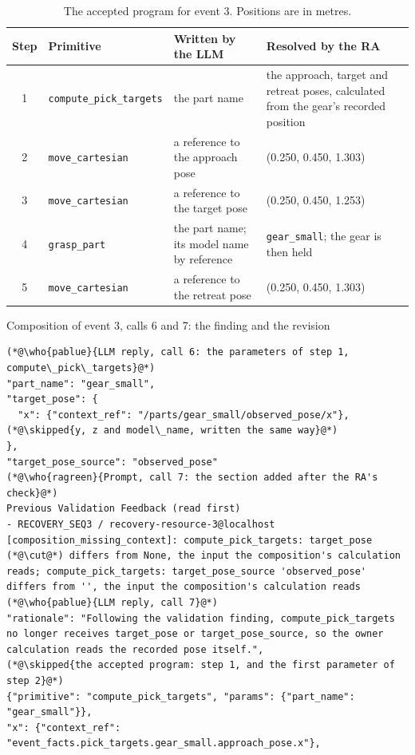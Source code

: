 \documentclass[preprint,12pt,authoryear]{elsarticle}
\newcommand{\vd}{\raisebox{-0.1ex}{\vbox{\baselineskip 3pt\lineskip 0pt\lineskiplimit 0pt\hbox{.}\hbox{.}\hbox{.}}}}
\newcommand{\skipped}[1]{{\normalfont\color{cutgray}\vd\enspace{\itshape\footnotesize #1}}}
\newcommand{\who}[2]{{\normalfont\sffamily\bfseries\footnotesize\color{#1}#2}}
\let\code\nolinkurl
\begin{document}
\begin{table}[H]
\centering\footnotesize
\setlength{\tabcolsep}{5pt}
\begin{tabularx}{\linewidth}{@{}c l Y Y@{}}
\toprule
Step & Primitive & Written by the LLM & Resolved by the RA \\
 & \code{compute_pick_targets} & the part name & the approach, target and retreat poses, calculated from the gear's recorded position \\
2 & \code{move_cartesian} & a reference to the approach pose & (0.250, 0.450, 1.303) \\
3 & \code{move_cartesian} & a reference to the target pose & (0.250, 0.450, 1.253) \\
4 & \code{grasp_part} & the part name; its model name by reference & \code{gear_small}; the gear is then held \\
5 & \code{move_cartesian} & a reference to the retreat pose & (0.250, 0.450, 1.303) \\
\bottomrule
\end{tabularx}
\caption{The accepted program for event 3. Positions are in metres.}\label{tab:program}
\end{table}

\begin{table}[H]
\begin{recbox}{Composition of event 3, calls 6 and 7: the finding and the revision}
\begin{lstlisting}
(*@\who{pablue}{LLM reply, call 6: the parameters of step 1, compute\_pick\_targets}@*)
"part_name": "gear_small",
"target_pose": {
  "x": {"context_ref": "/parts/gear_small/observed_pose/x"},
(*@\skipped{y, z and model\_name, written the same way}@*)
},
"target_pose_source": "observed_pose"
(*@\who{ragreen}{Prompt, call 7: the section added after the RA's check}@*)
Previous Validation Feedback (read first)
- RECOVERY_SEQ3 / recovery-resource-3@localhost [composition_missing_context]: compute_pick_targets: target_pose (*@\cut@*) differs from None, the input the composition's calculation reads; compute_pick_targets: target_pose_source 'observed_pose' differs from '', the input the composition's calculation reads
(*@\who{pablue}{LLM reply, call 7}@*)
"rationale": "Following the validation finding, compute_pick_targets no longer receives target_pose or target_pose_source, so the owner calculation reads the recorded pose itself.",
(*@\skipped{the accepted program: step 1, and the first parameter of step 2}@*)
{"primitive": "compute_pick_targets", "params": {"part_name": "gear_small"}},
"x": {"context_ref": "event_facts.pick_targets.gear_small.approach_pose.x"},
\end{lstlisting}
\end{recbox}
\caption{The one revision in the composition of event 3.}\label{tab:revision}
\end{table}
\end{document}
